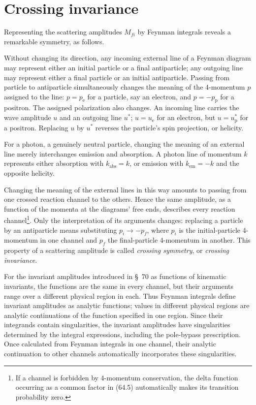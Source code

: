 \section{Crossing invariance}

Representing the scattering amplitudes $M_{fi}$ by Feynman integrals reveals a remarkable symmetry, as follows.

Without changing its direction, any incoming external line of a Feynman diagram may represent either an initial particle or a final antiparticle; any outgoing line may represent either a final particle or an initial antiparticle. Passing from particle to antiparticle simultaneously changes the meaning of the 4-momentum $p$ assigned to the line: $p=p_{\text{e}}$ for a particle, say an electron, and $p=-p_{\text{p}}$ for a positron. The assigned polarization also changes. An incoming line carries the wave amplitude $u$ and an outgoing line $u^*$; $u=u_{\text{e}}$ for an electron, but $u=u_{\text{p}}^*$ for a positron. Replacing $u$ by $u^*$ reverses the particle's spin projection, or helicity.

For a photon, a genuinely neutral particle, changing the meaning of an external line merely interchanges emission and absorption. A photon line of momentum $k$ represents either absorption with $k_{\text{abs}}=k$, or emission with $k_{\text{em}}=-k$ and the opposite helicity.

Changing the meaning of the external lines in this way amounts to passing from one crossed reaction channel to the others. Hence the same amplitude, as a function of the momenta at the diagrams' free ends, describes every reaction channel\footnote{If a channel is forbidden by 4-momentum conservation, the delta function occurring as a common factor in (64.5) automatically makes its transition probability zero.}. Only the interpretation of its arguments changes: replacing a particle by an antiparticle means substituting $p_i\to-p_f$, where $p_i$ is the initial-particle 4-momentum in one channel and $p_f$ the final-particle 4-momentum in another. This property of a scattering amplitude is called \emph{crossing symmetry}, or \emph{crossing invariance}.

For the invariant amplitudes introduced in \S~70 as functions of kinematic invariants, the functions are the same in every channel, but their arguments range over a different physical region in each. Thus Feynman integrals define invariant amplitudes as analytic functions; values in different physical regions are analytic continuations of the function specified in one region. Since their integrands contain singularities, the invariant amplitudes have singularities determined by the integral expressions, including the pole-bypass prescription. Once calculated from Feynman integrals in one channel, their analytic continuation to other channels automatically incorporates these singularities.

